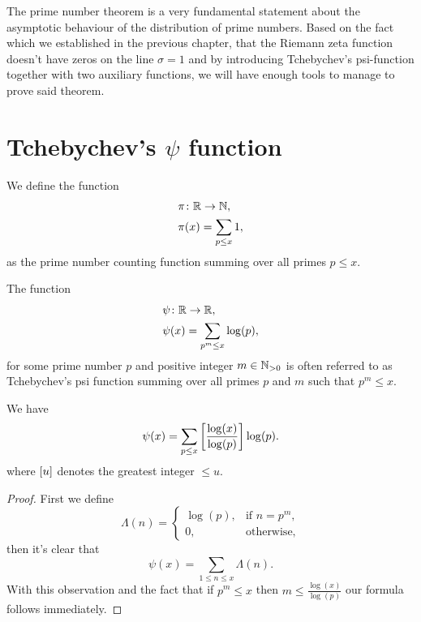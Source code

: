 The prime number theorem is a very fundamental statement about the asymptotic behaviour of the distribution of prime numbers. Based on the fact which we established in the previous chapter, that the Riemann zeta function doesn't have zeros on the line $\sigma = 1$ and by introducing Tchebychev's psi-function together with two auxiliary functions, we will have enough tools to manage to prove said theorem.


\section{Tchebychev's $\psi$ function}


\begin{definition}
	We define the function
\begin{equation*}
\begin{aligned}
	&\pi \colon \mathbb{R} \to \mathbb{N}, \\
	&\pi(x) = \sum _{p \leq x} 1,
\end{aligned}
\end{equation*}
	as the prime number counting function summing over all primes $p \leq x$.
\end{definition}


\begin{definition}
	The function
\begin{equation*}
\begin{aligned}
	&\psi \colon \mathbb{R} \to \mathbb{R}, \\
	&\psi(x) = \sum _{p^m \leq x} \log(p),
\end{aligned}
\end{equation*}
	for some prime number $p$ and positive integer $m \in \mathbb{N}_{> 0}$ is often referred to as Tchebychev's psi function summing over all primes $p$ and $m$ such that $p^m \leq x$.
\end{definition}


\begin{lemma}
	We have
\begin{equation*}
	\psi(x) = \sum _{p \leq x} \left[\frac{\log(x)}{\log(p)}\right] \log(p).
\end{equation*}
	where $\left[u\right]$ denotes the greatest integer $\leq u$.
\end{lemma}
\begin{proof}
	First we define
\begin{equation*}
	\Lambda(n) =
    	\left\{
    		\begin{array}{ll}
        		\log(p), & \text{if } n = p^m,\\
        		0, & \text{otherwise},
        	\end{array}
		\right.
\end{equation*}
	then it's clear that
\begin{equation*}
	\psi(x) = \sum _{1 \leq n \leq x} \Lambda(n).
\end{equation*}
	With this observation and the fact that if $p^m \leq x$ then $m \leq \frac{\log(x)}{\log(p)}$ our formula follows immediately.
\end{proof}


